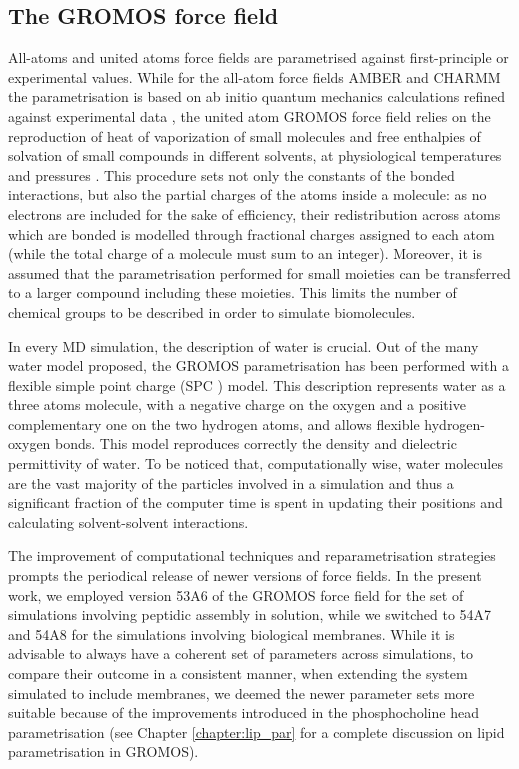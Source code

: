 \subsection{The GROMOS force field}
All-atoms and united atoms force fields are parametrised against first-principle or experimental values.
%
While for the all-atom force fields AMBER and CHARMM the parametrisation is based on ab initio quantum mechanics calculations refined against experimental data \citep{Maier2015,Dickson2014,Wang2004_amber,MacKerell1998,Klauda2010}, the united atom GROMOS force field relies on the reproduction of heat of vaporization of small molecules and free enthalpies of solvation of small compounds in different solvents, at physiological temperatures and pressures \citep{Oostenbrink2005,Schmid2011,Reif2013}.
%
This procedure sets not only the constants of the bonded interactions, but also the partial charges of the atoms inside a molecule: as no electrons are included for the sake of efficiency, their redistribution across atoms which are bonded is modelled through fractional charges assigned to each atom (while the total charge of a molecule must sum to an integer).
%
Moreover, it is assumed that the parametrisation performed for small moieties can be transferred to a larger compound including these moieties. This limits the number of chemical groups to be described in order to simulate biomolecules.

In every MD simulation, the description of water is crucial. Out of the many water model proposed, the GROMOS parametrisation has been performed with a flexible simple point charge (SPC \citep{Berendsen1981}) model. This description represents water as a three atoms molecule, with a negative charge on the oxygen and a positive complementary one on the two hydrogen atoms, and allows flexible hydrogen-oxygen bonds. This model reproduces correctly the density and dielectric permittivity of water. To be noticed that, computationally wise, water molecules are the vast majority of the particles involved in a simulation and thus a significant fraction of the computer time is spent in updating their positions and calculating solvent-solvent interactions.

The improvement of computational techniques and reparametrisation strategies prompts the periodical release of newer versions of force fields. In the present work, we employed version 53A6 of the GROMOS force field \citep{Oostenbrink2004} for the set of simulations involving peptidic assembly in solution, while we switched to 54A7 \citep{Schmid2011} and 54A8 \citep{Reif2013} for the simulations involving biological membranes. While it is advisable to always have a coherent set of parameters across simulations, to compare their outcome in a consistent manner, when extending the system simulated to include membranes, we deemed the newer parameter sets more suitable because of the improvements introduced in the phosphocholine head parametrisation (see Chapter \ref{chapter:lip_par} for a complete discussion on lipid parametrisation in GROMOS).


